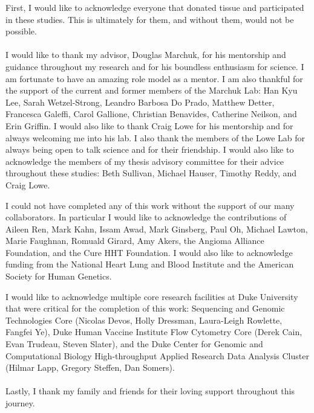 \acknowledgements
First, I would like to acknowledge everyone that donated tissue and participated in these studies. This is ultimately for them, and without them, would not be possible. 
\\ \\
I would like to thank my advisor, Douglas Marchuk, for his mentorship and guidance throughout my research and for his boundless enthusiasm for science. I am fortunate to have an amazing role model as a mentor. I am also thankful for the support of the current and former members of the Marchuk Lab: Han Kyu Lee, Sarah Wetzel-Strong, Leandro Barbosa Do Prado, Matthew Detter, Francesca Galeffi, Carol Gallione, Christian Benavides, Catherine Neilson, and Erin Griffin. I would also like to thank Craig Lowe for his mentorship and for always welcoming me into his lab. I also thank the members of the Lowe Lab for always being open to talk science and for their friendship. I would also like to acknowledge the members of my thesis advisory committee for their advice throughout these studies: Beth Sullivan, Michael Hauser, Timothy Reddy, and Craig Lowe. 

I could not have completed any of this work without the support of our many collaborators. In particular I would like to acknowledge the contributions of Aileen Ren, Mark Kahn, Issam Awad, Mark Ginsberg, Paul Oh, Michael Lawton, Marie Faughnan, Romuald Girard, Amy Akers, the Angioma Alliance Foundation, and the Cure HHT Foundation. I would also like to acknowledge funding from the National Heart Lung and Blood Institute and the American Society for Human Genetics.

I would like to acknowledge multiple core research facilities at Duke University that were critical for the completion of this work: Sequencing and Genomic Technologies Core (Nicolas Devos, Holly Dressman, Laura-Leigh Rowlette, Fangfei Ye), Duke Human Vaccine Institute Flow Cytometry Core (Derek Cain, Evan Trudeau, Steven Slater), and the Duke Center for Genomic and Computational Biology High-throughput Applied Research Data Analysis Cluster (Hilmar Lapp, Gregory Steffen, Dan Somers). 
\\ \\
Lastly, I thank my family and friends for their loving support throughout this journey. 